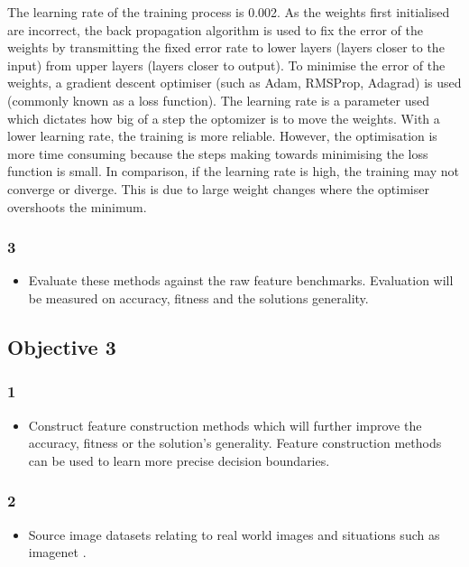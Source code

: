 The learning rate of the training process is 0.002. As the weights first initialised are incorrect, the back propagation algorithm is used to fix the error of the weights by transmitting the fixed error rate to lower layers (layers closer to the input) from upper layers (layers closer to output). To minimise the error of the weights, a gradient descent optimiser (such as Adam, RMSProp, Adagrad) is used (commonly known as a loss function). The learning rate is a parameter used which dictates how big of a step the optomizer is to move the weights. With a lower learning rate, the training is more reliable. However, the optimisation is more time consuming because the steps making towards minimising the loss function is small. In comparison, if the learning rate is high, the training may not converge or diverge. This is due to large weight changes where the optimiser overshoots the minimum.


\subsubsection{3}
\begin{itemize}
	\item Evaluate these methods against the raw feature benchmarks. Evaluation will be measured on accuracy, fitness and the solution\textquotesingle s generality. 
\end{itemize}

\subsection{Objective 3}
\subsubsection{1}
\begin{itemize}
	\item Construct feature construction methods which will further improve the accuracy, fitness or the solution's generality. Feature construction methods can be used to learn more precise decision boundaries.
\end{itemize}

\subsubsection{2}
\begin{itemize}
	\item Source image datasets relating to real world images and situations such as imagenet \cite{imagenet}.
\end{itemize}

